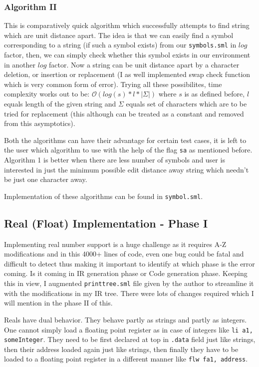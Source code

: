 \subsubsection{Algorithm II}

This is comparatively quick algorithm which successfully attempts to find string which are unit distance apart. The idea is that we can easily find a symbol corresponding to a string (if such a symbol exists) from our \texttt{symbols.sml} in $log$ factor, then, we can simply check whether this symbol exists in our environment in another $log$ factor. Now a string can be unit distance apart by a character deletion, or insertion or replacement (I as well implemented swap check function which is very common form of error). Trying all these possibilites, time complexity works out to be: $\mathcal{O}(log(s) * l * |\Sigma|)$ where $s$ is as defined before, $l$ equals length of the given string and $\Sigma$ equals set of characters which are to be tried for replacement (this although can be treated as a constant and removed from this asymptotics).

Both the algorithms can have their advantage for certain test cases, it is left to the user which algorithm to use with the help of the flag \texttt{sa} as mentioned before. Algorithm 1 is better when there are less number of symbols and user is interested in just the minimum possible edit distance away string which needn't be just one character away.

Implementation of these algorithms can be found in \texttt{symbol.sml}.

\subsection{Real (Float) Implementation - Phase I}

Implementing real number support is a huge challenge as it requires A-Z modifications and in this 4000+ lines of code, even one bug could be fatal and difficult to detect thus making it important to identify at which phase is the error coming. Is it coming in IR generation phase or Code generation phase. Keeping this in view, I augmented \texttt{printtree.sml} file given by the author to streamline it with the modifications in my IR tree. There were lots of changes required which I will mention in the phase II of this.

Reals have dual behavior. They behave partly as strings and partly as integers. One cannot simply load a floating point register as in case of integers like \texttt{li a1, someInteger}. They need to be first declared at top in \texttt{.data} field just like strings, then their address loaded again just like strings, then finally they have to be loaded to a floating point register in a different manner like \texttt{flw fa1, address}. 

